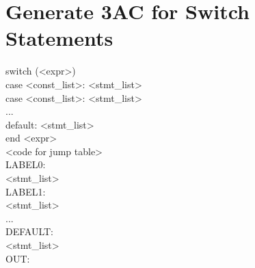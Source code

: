 \documentclass{report}
\newlength\tindent
\renewcommand{\indent}{\hspace*{\tindent}}
\begin{document}
\section{Generate 3AC for Switch Statements}
\vspace{-1em}
\begin{multicols}{2}
switch (<expr>) \\
\indent case <const\_list>: <stmt\_list> \\
\indent case <const\_list>: <stmt\_list> \\
\indent ... \\
\indent default: <stmt\_list> \\
end
  \vfill\columnbreak
\indent <expr> \\
\indent <code for jump table> \\
LABEL0: \\
\indent <stmt\_list> \\
LABEL1: \\
\indent <stmt\_list> \\
\indent ... \\
DEFAULT: \\
\indent <stmt\_list> \\
OUT:
\end{multicols}
\end{document}
